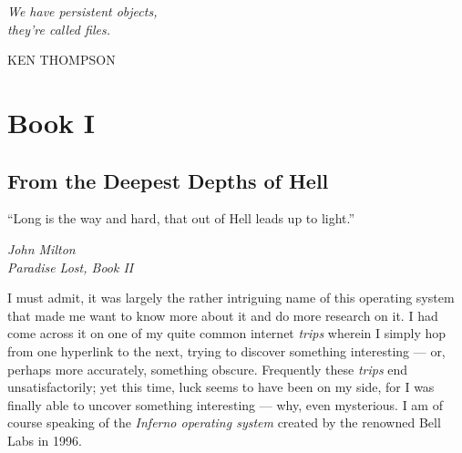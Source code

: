 \documentclass[a4paper,12pt]{report}
\newlength\longest
\begin{document}

\clearpage
\thispagestyle{empty}
\null\vfill
\settowidth{}
\begin{center}
\parbox{\longest}{%
  \raggedright{\huge\itshape%
    We have persistent objects, \\they're called files. \par\bigskip
  }
  \raggedleft\Large\MakeUppercase{Ken Thompson}\par%
}
\vfill\vfill
\clearpage\newpage
\end{center}


\thispagestyle{empty}
  \mbox{}
  \newpage


\part*{Book I}
  \newpage

\thispagestyle{empty}
  \mbox{}
  \newpage

\chapter*{From the Deepest Depths of Hell}

\epigraph{``Long is the way and hard, that out of Hell leads up to light.''}{\textit{John Milton\\Paradise Lost, Book II}}

I must admit, it was largely the rather intriguing name of this operating system that made me want to know more about it and do more research on it. I had come across it on one of my quite common internet \textit{trips} wherein I simply hop from one hyperlink to the next, trying to discover something interesting — or, perhaps more accurately, something obscure. 
Frequently these \textit{trips} end unsatisfactorily; yet this time, luck seems to have been on my side, for I was finally able to uncover something interesting — why, even mysterious. I am of course speaking of the \textit{Inferno operating system} created by the renowned Bell Labs in 1996. 
\end{document}
